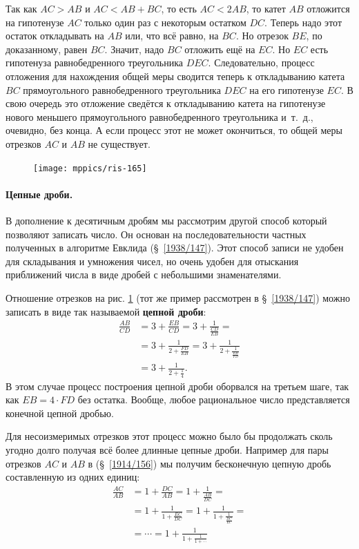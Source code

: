 \documentclass[twoside]{book}
\makeatletter
\newcommand{\rindex}[2][\imki@jobname]{%
  \index[#1]{\detokenize{#2}}%
}
\makeatother
\begin{document}
Так как $AC>AB$ и $AC<AB+BC$, то есть
$AC<2AB$, то катет $AB$ отложится на гипотенузе $AC$ только один раз с некоторым остатком $DC$.
Теперь надо этот остаток откладывать на $AB$ или, что всё равно, на $BC$.
Но отрезок $BE$, по доказанному, равен $BC$.
Значит, надо $BC$ отложить ещё на $EC$.
Но $EC$ есть гипотенуза равнобедренного треугольника $DEC$.
Следовательно, процесс отложения для нахождения общей меры сводится теперь к откладыванию катета $BC$ прямоугольного равнобедренного треугольника $DEC$ на его гипотенузе $EC$.
В свою очередь это отложение сведётся к откладыванию катета на гипотенузе нового меньшего прямоугольного равнобедренного треугольника и~т.~д., очевидно, без конца.
А если процесс этот не может окончиться, то общей меры отрезков $AC$ и $AB$ не существует.

\begin{figure}
\centering
\texttt{[image: mppics/ris-165]}
\caption{}\label{1938/ris-165-1}
\end{figure}

\paragraph{Цепные дроби.}\label{extra/tzepnye-drobi}
В дополнение к десятичным дробям мы рассмотрим другой способ который позволяют записать число.
Он основан на последовательности частных полученных в алгоритме Евклида (§~\ref{1938/147}).
Этот способ записи не удобен для складывания и умножения чисел, но очень удобен для отыскания приближений числа в виде дробей с небольшими знаменателями.


Отношение отрезков на рис. \ref{1938/ris-165-1} (тот же пример рассмотрен в §~\ref{1938/147}) можно записать в виде так называемой \rindex{цепная дробь}\textbf{цепной дроби}:
\begin{align*}
\frac{AB}{CD}&=3+\frac{EB}{CD}=3+\frac{1}{\frac{CD}{EB}}=
\\
&=3+\frac{1}{2+\frac{FD}{EB}}=3+\frac{1}{2+\frac{1}{\frac{EB}{FD}}}
\\
&=3+\frac{1}{2+\frac{1}{4}}.
\end{align*}
В этом случае процесс построения цепной дроби оборвался на третьем шаге, так как $EB=4\cdot FD$ без остатка.
Вообще, любое рациональное число представляется конечной цепной дробью.

Для несоизмеримых отрезков этот процесс можно было бы продолжать сколь угодно долго получая всё более длинные цепные дроби.
Например для пары отрезков $AC$ и $AB$ в (§~\ref{1914/156}) мы получим бесконечную цепную дробь составленную из одних единиц: 
\begin{align*}
\frac{AC}{AB}&=1+\frac{DC}{AB}=1+\frac1{\frac{AB}{DC}}=
\\
&=1+\frac1{1+\frac{EC}{DC}}=1+\frac1{1+\frac1{\frac{DC}{EC}}}=
\\
&=\cdots=1+\frac1{1+\frac1{1+\cdots}}
\end{align*}
\end{document}
